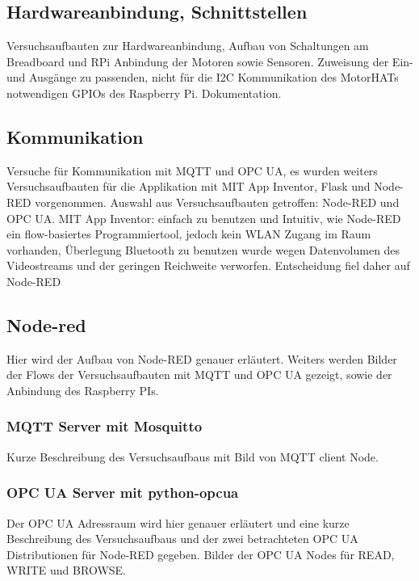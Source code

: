 \documentclass[BMR,Bachelor,ngerman]{twbook}%
\begin{document}
\subsection{Hardwareanbindung, Schnittstellen}
Versuchsaufbauten zur Hardwareanbindung, Aufbau von Schaltungen am Breadboard und RPi Anbindung der Motoren sowie Sensoren. Zuweisung der Ein- und Ausgänge zu passenden, nicht für die I2C Kommunikation des MotorHATs notwendigen GPIOs des Raspberry Pi. Dokumentation.
%
\subsection{Kommunikation} 
Versuche für Kommunikation mit MQTT und OPC UA, es wurden weiters Versuchsaufbauten für die Applikation mit MIT App Inventor, Flask und Node-RED vorgenommen. Auswahl aus Versuchsaufbauten getroffen: Node-RED und OPC UA.
MIT App Inventor: einfach zu benutzen und Intuitiv, wie Node-RED ein flow-basiertes Programmiertool, jedoch kein WLAN Zugang im Raum vorhanden, Überlegung Bluetooth zu benutzen wurde wegen Datenvolumen des Videostreams und der geringen Reichweite verworfen. Entscheidung fiel daher auf Node-RED
\subsection{Node-red}
Hier wird der Aufbau von Node-RED genauer erläutert. Weiters werden Bilder der Flows der Versuchsaufbauten mit MQTT und OPC UA gezeigt, sowie der Anbindung des Raspberry PIs.
\subsubsection{MQTT Server mit Mosquitto}
Kurze Beschreibung des Versuchsaufbaus mit Bild von MQTT client Node.
\subsubsection{OPC UA Server mit python-opcua}
Der OPC UA Adressraum wird hier genauer erläutert und eine kurze Beschreibung des Versuchsaufbaus und der zwei betrachteten OPC UA Distributionen für Node-RED gegeben. Bilder der OPC UA Nodes für READ, WRITE und BROWSE.
%
%
%
\end{document}
